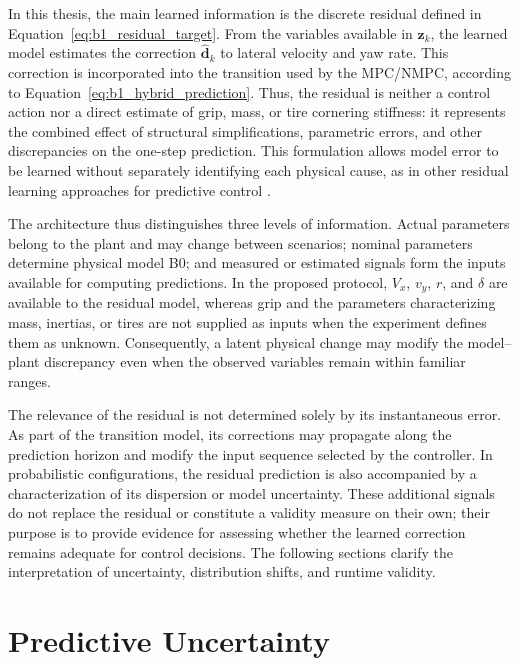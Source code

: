 \documentclass[12pt,a4paper]{report}
\begin{document}
In this thesis, the main learned information is the discrete residual defined in Equation~\eqref{eq:b1_residual_target}. From the variables available in $\mathbf{z}_k$, the learned model estimates the correction $\hat{\mathbf{d}}_k$ to lateral velocity and yaw rate. This correction is incorporated into the transition used by the MPC/NMPC, according to Equation~\eqref{eq:b1_hybrid_prediction}. Thus, the residual is neither a control action nor a direct estimate of grip, mass, or tire cornering stiffness: it represents the combined effect of structural simplifications, parametric errors, and other discrepancies on the one-step prediction. This formulation allows model error to be learned without separately identifying each physical cause, as in other residual learning approaches for predictive control \cite{Kabzan2019LearningBased,Chen2026Hybrid}.

The architecture thus distinguishes three levels of information. Actual parameters belong to the plant and may change between scenarios; nominal parameters determine physical model B0; and measured or estimated signals form the inputs available for computing predictions. In the proposed protocol, $V_x$, $v_y$, $r$, and $\delta$ are available to the residual model, whereas grip and the parameters characterizing mass, inertias, or tires are not supplied as inputs when the experiment defines them as unknown. Consequently, a latent physical change may modify the model--plant discrepancy even when the observed variables remain within familiar ranges.

The relevance of the residual is not determined solely by its instantaneous error. As part of the transition model, its corrections may propagate along the prediction horizon and modify the input sequence selected by the controller. In probabilistic configurations, the residual prediction is also accompanied by a characterization of its dispersion or model uncertainty. These additional signals do not replace the residual or constitute a validity measure on their own; their purpose is to provide evidence for assessing whether the learned correction remains adequate for control decisions. The following sections clarify the interpretation of uncertainty, distribution shifts, and runtime validity.

\section{Predictive Uncertainty}
\label{sec:incertidumbre_predictiva}
\end{document}
